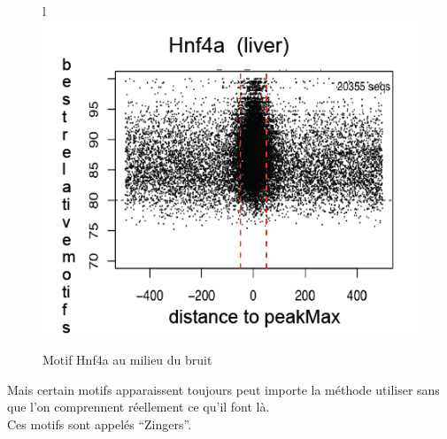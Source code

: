 \begin{figure}{l}{}
\centering
\includegraphics[scale=0.5]{peakmax}
\caption{Motif Hnf4a au milieu du bruit}
\end{figure}

Mais certain motifs apparaissent toujours peut importe la méthode utiliser sans que l'on comprennent réellement ce qu'il font là.\\
Ces motifs sont appelés ``Zingers''.
